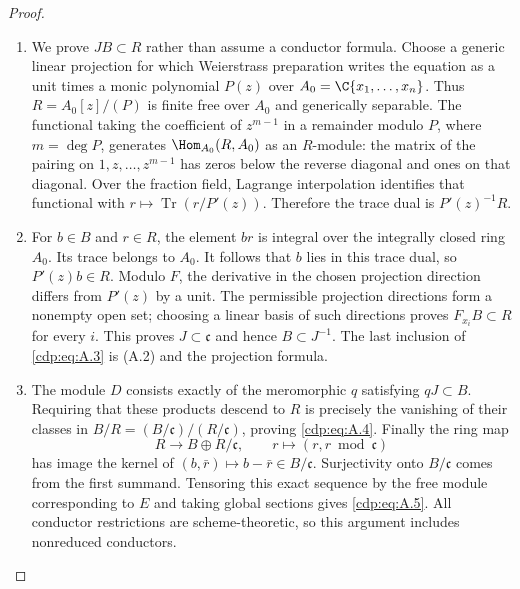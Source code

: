 \begin{proof}

\begin{enumerate}[label={$\langle1\rangle$\arabic*.},leftmargin=*]
\item We prove $JB\subset R$ rather than assume a conductor formula. Choose a generic linear projection for which Weierstrass preparation writes the equation as a unit times a monic polynomial $P(z)$ over $A_0=\C\{x_1,\ldots,x_n\}$. Thus $R=A_0[z]/(P)$ is finite free over $A_0$ and generically separable. The functional taking the coefficient of $z^{m-1}$ in a remainder modulo $P$, where $m=\deg P$, generates $\Hom_{A_0}(R,A_0)$ as an $R$-module: the matrix of the pairing on $1,z,\ldots,z^{m-1}$ has zeros below the reverse diagonal and ones on that diagonal. Over the fraction field, Lagrange interpolation identifies that functional with $r\mapsto\operatorname{Tr}(r/P'(z))$. Therefore the trace dual is $P'(z)^{-1}R$.

\item For $b\in B$ and $r\in R$, the element $br$ is integral over the integrally closed ring $A_0$. Its trace belongs to $A_0$. It follows that $b$ lies in this trace dual, so $P'(z)b\in R$. Modulo $F$, the derivative in the chosen projection direction differs from $P'(z)$ by a unit. The permissible projection directions form a nonempty open set; choosing a linear basis of such directions proves $F_{x_i}B\subset R$ for every $i$. This proves $J\subset\mathfrak c$ and hence $B\subset J^{-1}$. The last inclusion of \eqref{cdp:eq:A.3} is (A.2) and the projection formula.

\item The module $D$ consists exactly of the meromorphic $q$ satisfying $qJ\subset B$. Requiring that these products descend to $R$ is precisely the vanishing of their classes in $B/R=(B/\mathfrak c)/(R/\mathfrak c)$, proving \eqref{cdp:eq:A.4}. Finally the ring map
\[
 R\longrightarrow B\oplus R/\mathfrak c,
 \qquad r\longmapsto(r,r\bmod\mathfrak c)
\]
has image the kernel of $(b,\bar r)\mapsto b-\bar r\in B/\mathfrak c$. Surjectivity onto $B/\mathfrak c$ comes from the first summand. Tensoring this exact sequence by the free module corresponding to $E$ and taking global sections gives \eqref{cdp:eq:A.5}. All conductor restrictions are scheme-theoretic, so this argument includes nonreduced conductors.

\end{enumerate}
\end{proof}